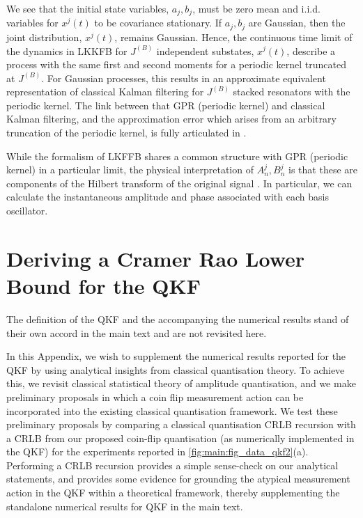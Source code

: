 We see that the initial state variables, $a_j, b_j$, must be zero mean and i.i.d. variables for $x^j(t)$ to be covariance stationary. If $a_j, b_j$ are Gaussian, then the joint distribution, $x^j(t)$, remains Gaussian. Hence, the continuous time limit of the dynamics in LKKFB for $J^{(B)}$  independent substates, $x^j(t)$, describe a process with the same first and second moments for a periodic kernel truncated at $J^{(B)}$. For Gaussian processes, this results in an approximate equivalent representation of classical Kalman filtering for $J^{(B)}$ stacked resonators with the periodic kernel. The link between that GPR (periodic kernel) and classical Kalman filtering, and the approximation error which arises from an arbitrary truncation of the periodic kernel, is fully articulated in \cite{solin2014explicit}. 


While the formalism of LKFFB shares a common structure with GPR (periodic kernel) in a particular limit, the  physical interpretation of $A^j_{n}, B^j_{n}$ is that these are components of the Hilbert transform of the original signal \cite{livska2007}. In particular, we can calculate the instantaneous amplitude and phase associated with each basis oscillator. 





\clearpage
\section{Deriving a Cramer Rao Lower Bound for the QKF \label{sec:app:qkf}}
The definition of the QKF and the accompanying the numerical results stand of their own accord in the main text and are not revisited here. 

In this Appendix, we wish to supplement the numerical results reported for the QKF by using analytical insights from classical quantisation theory. To achieve this, we revisit classical statistical theory of amplitude quantisation, and we make preliminary proposals in which a coin flip measurement action can be incorporated into the existing classical quantisation framework.  We test these preliminary proposals by comparing a classical quantisation CRLB recursion  with a CRLB from our proposed coin-flip quantisation (as numerically implemented in the QKF) for the experiments reported in \cref{fig:main:fig_data_qkf2}(a). Performing a CRLB recursion provides a simple sense-check on our analytical statements, and provides some evidence for grounding the atypical measurement action in the QKF within a theoretical framework, thereby supplementing the standalone numerical results for QKF in the main text.


